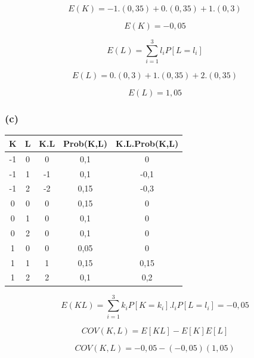 \documentclass[hidelinks,11pt]{book}
\theoremstyle{definition}
\begin{document}
\begin{displaymath}
	E(K) = -1.(0,35) + 0.(0,35) + 1.(0,3)
\end{displaymath}

\begin{displaymath}
	E(K) = -0,05
\end{displaymath}

\begin{displaymath}
	E(L) = \sum_{i = 1}^{3} l_i P[L = l_i]
\end{displaymath}

\begin{displaymath}
	E(L) = 0. (0,3) + 1. (0,35) + 2. (0,35)
\end{displaymath}

\begin{displaymath}
	E(L) = 1,05
\end{displaymath}


\subsubsection{(c)}

	\begin{center}
	\begin{tabular}{|c|c|c|c|c|}\hline
		K & L & K.L & Prob(K,L) & K.L.Prob(K,L)\\\hline
		-1 & 0& 0 & 0,1 & 0\\\hline
		-1 & 1 & -1 & 0,1 &  -0,1\\\hline
		-1 & 2 & -2& 0,15 & -0,3\\\hline
		0 & 0& 0 & 0,15 & 0\\\hline
		0 & 1 & 0 & 0,1 &  0\\\hline
		0 & 2 & 0& 0,1 & 0\\\hline
		1 & 0& 0 & 0,05 & 0\\\hline
		1 & 1 & 1 & 0,15 &  0,15\\\hline
		1 & 2 & 2& 0,1 & 0,2\\\hline
	\end{tabular}
\end{center}

\begin{displaymath}
	E(KL) = \sum_{i = 1}^{3} k_i P[K = k_i].l_i P[L = l_i] = -0,05
\end{displaymath}


\begin{displaymath}
	COV(K,L) = E[KL] - E[K]E[L]
\end{displaymath}

\begin{displaymath}
	COV(K,L) = -0,05 - (-0,05)(1,05)
\end{displaymath}
\end{document}
